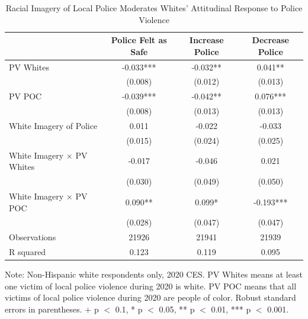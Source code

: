 \documentclass[
  12pt,
]{article}
\begin{document}
\hypertarget{tbl-racial.component}{}
\begin{table}
\caption{\label{tbl-racial.component}Racial Imagery of Local Police Moderates Whites' Attitudinal Response to
Police Violence }\tabularnewline

\centering
\begin{threeparttable}
\begin{tabular}[t]{lccc}
\toprule
  & Police Felt as Safe & Increase Police & Decrease Police\\
\midrule
PV Whites & -0.033*** & -0.032** & 0.041**\\
 & (0.008) & (0.012) & (0.013)\\
PV POC & -0.039*** & -0.042** & 0.076***\\
 & (0.008) & (0.013) & (0.013)\\
White Imagery of Police & 0.011 & -0.022 & -0.033\\
 & (0.015) & (0.024) & (0.025)\\
White Imagery × PV Whites & -0.017 & -0.046 & 0.021\\
 & (0.030) & (0.049) & (0.050)\\
White Imagery × PV POC & 0.090** & 0.099* & -0.193***\\
 & (0.028) & (0.047) & (0.047)\\
\midrule
Observations & 21926 & 21941 & 21939\\
R squared & 0.123 & 0.119 & 0.095\\
\bottomrule
\end{tabular}
\begin{tablenotes}
\item Note: Non-Hispanic white respondents only, 2020 CES. PV Whites means at least one victim of local police violence during 2020 is white. PV POC means that all victims of local police violence during 2020 are people of color. Robust standard errors in parentheses. + p $<$ 0.1, * p $<$ 0.05, ** p $<$ 0.01, *** p $<$ 0.001.
\end{tablenotes}
\end{threeparttable}
\end{table}
\end{document}
